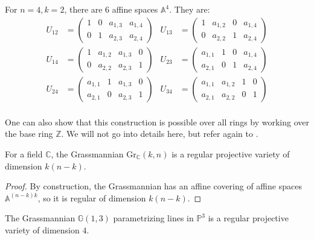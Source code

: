 \begin{example}
    For $n=4, k=2$, there are 6 affine spaces $\mathbb{A}^4$. They are:
    \begin{align*}
        U_{12} &=\begin{pmatrix}1 & 0 & a_{1,3} & a_{1,4} \\0 & 1 & a_{2,3} & a_{2,4}\end{pmatrix} &  U_{13} &=\begin{pmatrix}1 & a_{1,2} & 0 & a_{1,4} \\0 & a_{2,2} & 1 & a_{2,4}\end{pmatrix} \\
        U_{14} &=\begin{pmatrix}1 & a_{1,2} & a_{1,3} & 0 \\0 & a_{2,2} & a_{2,3} & 1\end{pmatrix} & U_{23} &=\begin{pmatrix}a_{1,1} & 1 & 0 & a_{1,4} \\a_{2,1} & 0 & 1 & a_{2,4}\end{pmatrix} \\
        U_{24} &=\begin{pmatrix}a_{1,1} & 1 & a_{1,3} & 0 \\a_{2,1} & 0 & a_{2,3} & 1\end{pmatrix} & U_{34} &=\begin{pmatrix}a_{1,1} & a_{1,2} & 1 & 0 \\a_{2,1} & a_{2,2} & 0 & 1\end{pmatrix}\\
    \end{align*}
\end{example}
One can also show that this construction is possible over all rings by working over the base ring $\mathbb{Z}$. We will not go into details here, but refer again to \cite[Section A.8]{EO25}.

\begin{proposition}%
    For a field $\mathbb{C}$, the Grassmannian $\mathrm{Gr}_\mathbb{C}(k,n)$ is a regular projective variety of dimension $k(n-k)$.
\end{proposition}
\begin{proof}
    By construction, the Grassmannian has an affine covering of affine spaces $\mathbb{A}^{(n-k)k}$, so it is regular of dimension $k(n-k)$.
\end{proof}

\begin{example}\label{ex:G13}
    The Grassmannian $\mathbb{G}(1,3)$ parametrizing lines in $\mathbb{P}^3$ is a regular projective variety of dimension $4$.
\end{example}



